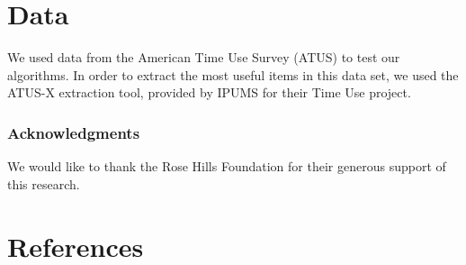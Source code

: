 \documentclass{article}
\newcommand{\todo}[1]{}
\begin{document}
\section{Data}
	We used data from the American Time Use Survey (ATUS) to test our algorithms.
	In order to extract the most useful items in this data set, we used the ATUS-X extraction tool, provided by IPUMS for their Time Use project.
	

\subsubsection*{Acknowledgments}
We would like to thank the Rose Hills Foundation for their generous support of this research.
\todo{}
\section*{References}
\todo{}

%
\end{document}
